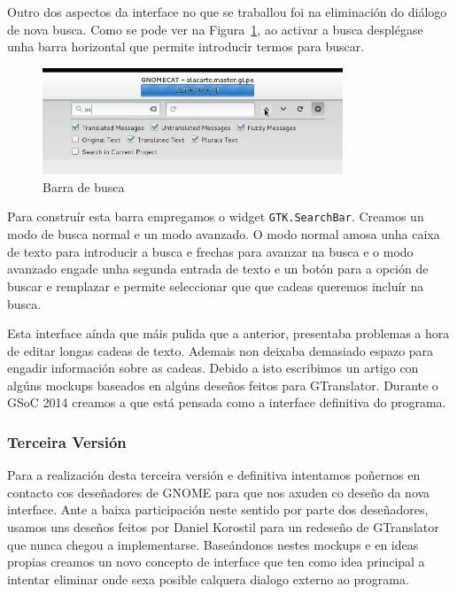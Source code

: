 Outro dos aspectos da interface no que se traballou foi na eliminación do diálogo de nova busca. Como se pode ver na Figura~\ref{fig:ui:v2:search}, ao activar a busca desplégase unha barra horizontal que permite introducir termos para buscar.

\begin{figure}[h!]
  \centering
    \includegraphics[width=0.8\textwidth]{img/curso2014_it2_search.png}
    \caption{Barra de busca}
    \label{fig:ui:v2:search}
\end{figure}

Para construír esta barra empregamos o widget \lstinline{GTK.SearchBar}. Creamos un modo de busca normal e un modo avanzado. O modo normal amosa unha caixa de texto para introducir a busca e frechas para avanzar na busca e o modo avanzado engade unha segunda entrada de texto e un botón para a opción de buscar e remplazar e permite seleccionar que que cadeas queremos incluír na busca.

Esta interface aínda que máis pulida que a anterior, presentaba problemas a hora de editar longas cadeas de texto. Ademais non deixaba demasiado espazo para engadir información sobre as cadeas. Debido a isto escribimos un artigo con algúns mockups baseados en algúns deseños feitos para GTranslator. Durante o GSoC 2014 creamos a que está pensada como a interface definitiva do programa.

\subsubsection{Terceira Versión}
Para a realización desta terceira versión e definitiva intentamos poñernos en contacto cos deseñadores de GNOME para que nos axuden co deseño da nova interface. Ante a baixa participación neste sentido por parte dos deseñadores, usamos uns deseños feitos por Daniel Korostil para un redeseño de GTranslator que nunca chegou a implementarse. Baseándonos nestes mockups e en ideas propias creamos un novo concepto de interface que ten como idea principal a intentar eliminar onde sexa posible calquera dialogo externo ao programa.

